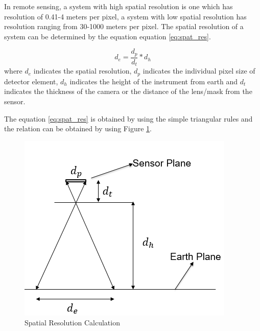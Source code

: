 In remote sensing, a system with high spatial resolution is one which has resolution of 0.41-4 meters per pixel, a system with low spatial resolution has resolution ranging from 30-1000 meters per pixel\cite{SpatialResol}. The spatial resolution of a system can be determined by the equation equation \ref{eq:spat_res}. 

\begin{equation}
\label{eq:spat_res}
d_e = \frac{d_p}{d_t} * d_h
\end{equation}
where $d_e$ indicates the spatial resolution, $d_p$ indicates the individual pixel size of detector element, $d_h$ indicates the height of the instrument from earth and $d_t$ indicates the thickness of the camera or the distance of the lens/mask from the sensor.

The equation \ref{eq:spat_res} is obtained by using the simple triangular rules and the relation can be obtained by using Figure \ref{fig:spatial_resolution_calc}.
\begin{figure}[htb]
\includegraphics[width=\textwidth]{pics/spatialRes}
\caption{Spatial Resolution Calculation}
\label{fig:spatial_resolution_calc}
\end{figure}

